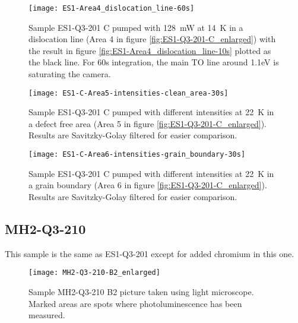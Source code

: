 \begin{figure}[H]
\centering
\texttt{[image: ES1-Area4\_dislocation\_line-60s]}
\caption[ES1-Q3-201 at a dislocation line]{Sample ES1-Q3-201 C pumped with 128~mW at 14~K in a dislocation line (Area 4 in figure \ref{fig:ES1-Q3-201-C_enlarged}) with the result in figure \ref{fig:ES1-Area4_dislocation_line-10s} plotted as the black line. For 60s integration, the main TO line around 1.1eV is saturating the camera.}
\label{fig:ES1-Area4_dislocation_line-60s}%
\end{figure}



\begin{figure}[H]
\centering
\texttt{[image: ES1-C-Area5-intensities-clean\_area-30s]}
\caption[ES1-Q3-201 at a defect free area]{Sample ES1-Q3-201 C pumped with different intensities at 22~K in a defect free area (Area 5 in figure \ref{fig:ES1-Q3-201-C_enlarged}). Results are Savitzky-Golay filtered for easier comparison.}
\label{fig:ES1-C-Area5-intensities-clean_area-30s}%
\end{figure}

\begin{figure}[H]
\centering
\texttt{[image: ES1-C-Area6-intensities-grain\_boundary-30s]}
\caption[ES1-Q3-201 at a grain boundary]{Sample ES1-Q3-201 C pumped with different intensities at 22~K in a grain boundary (Area 6 in figure \ref{fig:ES1-Q3-201-C_enlarged}). Results are Savitzky-Golay filtered for easier comparison.}
\label{fig:ES1-C-Area6-intensities-grain_boundary-30s}%
\end{figure}





\subsection{MH2-Q3-210}

This sample is the same as ES1-Q3-201 except for added chromium in this one.



\begin{figure}[H]
\centering
\texttt{[image: MH2-Q3-210-B2\_enlarged]}
\caption[MH2-Q3-210 B2 from light microscope]{Sample MH2-Q3-210 B2 picture taken using light microscope. Marked areas are spots where photoluminescence has been measured.}
\label{fig:MH2-Q3-210-B2_enlarged}%
\end{figure}



